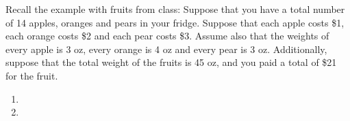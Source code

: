 Recall the example with fruits from class: Suppose that you have a total number of 14 apples, oranges and pears in your fridge. Suppose that each apple costs \$1, each orange costs \$2 and each pear costs \$3. Assume also that the weights of every apple is 3 oz, every orange is 4 oz
and every pear is 3 oz. Additionally, suppose that the total weight of the fruits is 45 oz, and you paid a total of \$21 for the fruit.

\begin{enumerate}
    \item 
    \item 
\end{enumerate}